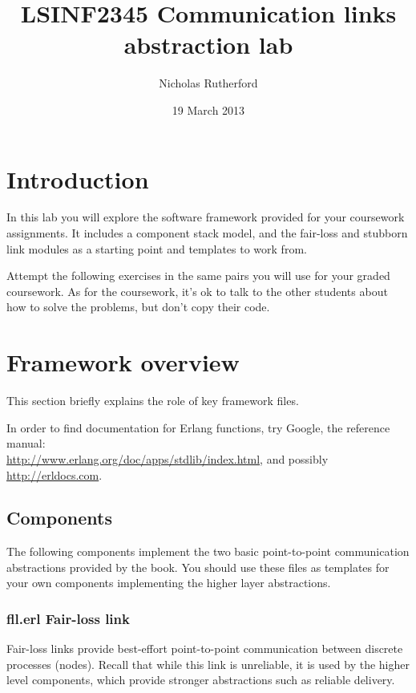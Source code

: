 \documentclass[a4paper]{article}
\title{LSINF2345 Communication links abstraction lab}
\author{Nicholas Rutherford}
\date{19 March 2013}
\begin{document}
\lstset{language=erlang}

\ifpdf
{}
\else
{}
\fi

\maketitle


\section{Introduction}

In this lab you will explore the software framework provided
for your coursework assignments. It includes a component stack model, and the
fair-loss and stubborn link modules as a starting point and templates to work
from.

Attempt the following exercises in the same pairs you will use for your graded
coursework. As for the coursework, it's ok to talk to the other students about
how to solve the problems, but don't copy their code.

\section{Framework overview} %
\label{sec:framework_overview}

This section briefly explains the role of key framework files.

In order to find documentation for Erlang functions, try Google, the reference
manual: \\
\url{http://www.erlang.org/doc/apps/stdlib/index.html}, and possibly
\url{http://erldocs.com}.

\subsection{Components} %
\label{sub:components}

The following components implement the two basic point-to-point communication
abstractions provided by the book. You should use these files as templates
for your own components implementing the higher layer abstractions.

\subsubsection{fll.erl Fair-loss link} %
\label{ssub:fll_erl}

Fair-loss links provide best-effort point-to-point communication between
discrete processes (nodes). Recall that while this link is unreliable, it is
used by the higher level components, which provide stronger abstractions such
as reliable delivery.
\end{document}
